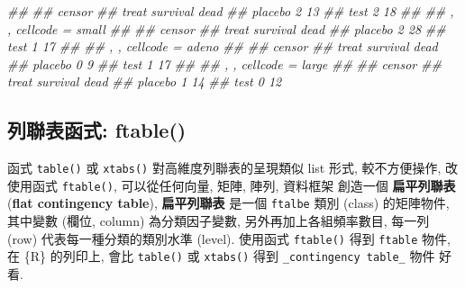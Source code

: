 \documentclass[
]{book}
\newenvironment{Shaded}{\begin{snugshade}}{\end{snugshade}}
\newcommand{\CommentTok}[1]{\textcolor[rgb]{0.56,0.35,0.01}{\textit{#1}}}
\newcommand{\FloatTok}[1]{\textcolor[rgb]{0.00,0.00,0.81}{#1}}
\newcommand{\KeywordTok}[1]{\textcolor[rgb]{0.13,0.29,0.53}{\textbf{#1}}}
\newcommand{\NormalTok}[1]{#1}
\newcommand{\OperatorTok}[1]{\textcolor[rgb]{0.81,0.36,0.00}{\textbf{#1}}}
\newcommand{\StringTok}[1]{\textcolor[rgb]{0.31,0.60,0.02}{#1}}
\begin{document}
\begin{Shaded}
\begin{Highlighting}[]
\CommentTok{\#\# }
\CommentTok{\#\#          censor}
\CommentTok{\#\# treat     survival dead}
\CommentTok{\#\#   placebo        2   13}
\CommentTok{\#\#   test           2   18}
\CommentTok{\#\# }
\CommentTok{\#\# , , cellcode = small}
\CommentTok{\#\# }
\CommentTok{\#\#          censor}
\CommentTok{\#\# treat     survival dead}
\CommentTok{\#\#   placebo        2   28}
\CommentTok{\#\#   test           1   17}
\CommentTok{\#\# }
\CommentTok{\#\# , , cellcode = adeno}
\CommentTok{\#\# }
\CommentTok{\#\#          censor}
\CommentTok{\#\# treat     survival dead}
\CommentTok{\#\#   placebo        0    9}
\CommentTok{\#\#   test           1   17}
\CommentTok{\#\# }
\CommentTok{\#\# , , cellcode = large}
\CommentTok{\#\# }
\CommentTok{\#\#          censor}
\CommentTok{\#\# treat     survival dead}
\CommentTok{\#\#   placebo        1   14}
\CommentTok{\#\#   test           0   12}
\end{Highlighting}
\end{Shaded}

\hypertarget{ux5217ux806fux8868ux51fdux5f0f-ftable}{%
\subsection{列聯表函式: ftable()}\label{ux5217ux806fux8868ux51fdux5f0f-ftable}}

函式
\texttt{table()}
或
\texttt{xtabs()}
對高維度列聯表的呈現類似 list 形式,
較不方便操作,
改使用函式
\texttt{ftable()},
可以從任何向量, 矩陣, 陣列, 資料框架
創造一個
\textbf{扁平列聯表}
(\textbf{flat contingency table}),
\textbf{扁平列聯表}
是一個
\texttt{ftalbe}
類別 (class) 的矩陣物件,
其中變數 (欄位, column) 為分類因子變數,
另外再加上各組頻率數目,
每一列 (row) 代表每一種分類的類別水準 (level).
使用函式
\texttt{ftable()}
得到
\texttt{ftable} 物件,
在 \{R\} 的列印上,
會比
\texttt{table()}
或
\texttt{xtabs()}
得到
\texttt{\_contingency\ table\_} 物件
好看.

\begin{Shaded}
\end{Shaded}
\end{document}
